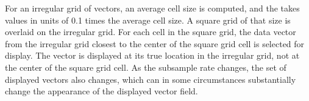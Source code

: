 For an irregular grid of vectors, an average cell size is computed,
and the  takes values in units of 0.1 times the
average cell size.  A square grid of that size is overlaid on the
irregular grid.  For each cell in the square grid, the data vector
from the irregular grid closest to the center of the square grid
cell is selected for display.  The vector is displayed at its true
location in the irregular grid, not at the center of the square
grid cell.  As the subsample rate changes, the set of displayed
vectors also changes, which can in some circumstances substantially
change the appearance of the displayed vector field.

%
%
%
